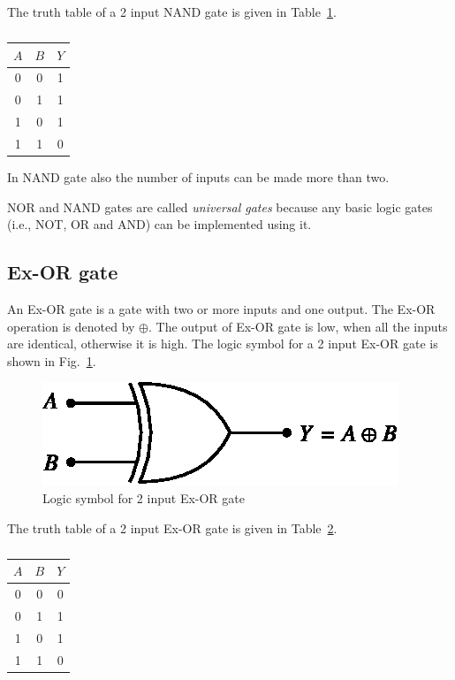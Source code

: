 The truth table of a 2 input NAND gate is given in Table~\ref{tab5.16a}.
\begin{table}[H]
\centering
\caption{}\label{tab5.16a}
\tabcolsep=10pt
\renewcommand{\arraystretch}{1.2}
\begin{tabular}{|cc|c|}
\hline
\boldmath$A$ & \boldmath$B$ & \boldmath$Y$\\
\hline
0 & 0 & 1\\
0 & 1 & 1\\
1 & 0 & 1\\
1 & 1 & 0\\
\hline
\end{tabular}
\end{table}

In NAND gate also the number of inputs can be made more than two.

\begin{note}
NOR and NAND gates are called {\em universal gates} because any basic logic gates (i.e., NOT, OR and AND) can be implemented using it.
\end{note}

\subsection{Ex-OR gate}\label{sec5.14.5}

An Ex-OR gate is a gate with two or more inputs and one output. The Ex-OR operation is denoted by $\oplus$. The output of Ex-OR gate is low, when all the inputs are identical, otherwise it is high. The logic symbol for a 2 input Ex-OR gate is shown in Fig.~\ref{fig5.14}.
\begin{figure}[H]
\centering
\includegraphics{chap5/fig5.15.eps}
\caption{Logic symbol for 2 input Ex-OR gate}\label{fig5.14}
\end{figure}

The truth table of a 2 input Ex-OR gate is given in Table~\ref{tab5.17a}.
\begin{table}[H]
\centering
\caption{}\label{tab5.17a}
\tabcolsep=10pt
\renewcommand{\arraystretch}{1.2}
\begin{tabular}{|cc|c|}
\hline
\boldmath$A$ & \boldmath$B$ & \boldmath$Y$\\
\hline
0 & 0 & 0\\
0 & 1 & 1\\
1 & 0 & 1\\
1 & 1 & 0\\
\hline
\end{tabular}
\end{table}

